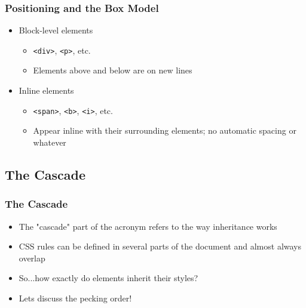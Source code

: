 \documentclass[10pt]{beamer}
\begin{document}
\frame
{
  \frametitle{Positioning and the Box Model}

  \begin{itemize}
    \item Block-level elements
      \begin{itemize}
        \item \lstinline|<div>|, \lstinline|<p>|, etc.
        \item Elements above and below are on new lines
      \end{itemize}
    \item Inline elements
      \begin{itemize}
        \item \lstinline|<span>|, \lstinline|<b>|, \lstinline|<i>|, etc.
        \item Appear inline with their surrounding elements; no automatic spacing or whatever
      \end{itemize}
  \end{itemize}
}


\subsection{The Cascade}
\frame
{
  \frametitle{The Cascade}

  \begin{itemize}
    \item The "cascade" part of the acronym refers to the way inheritance works
    \item CSS rules can be defined in several parts of the document and almost always overlap
    \item So...how exactly do elements inherit their styles?
    \item Lets discuss the pecking order!
  \end{itemize}
}
\end{document}
